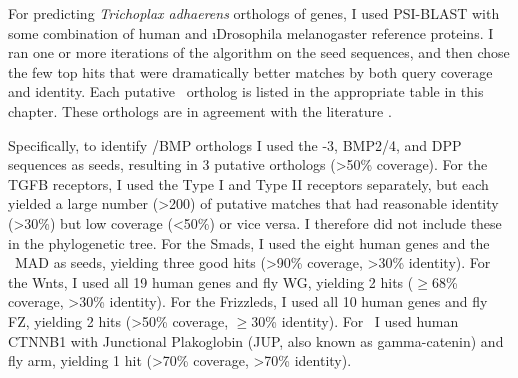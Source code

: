 For predicting \textit{Trichoplax adhaerens} orthologs of
genes, I used PSI-BLAST \cite{Altschul1997} with some combination of
human and \i{Drosophila melanogaster} reference proteins. I ran one or more
iterations of the algorithm on the seed sequences, and then chose the few top hits
that were dramatically better matches by both query coverage
and identity. Each putative \ta\ ortholog is listed in the appropriate table in
this chapter. These orthologs are in agreement with the literature
\cite{Srivastava2008}.


Specifically, to identify \tgf/BMP
orthologs I used the -3, BMP2/4, and DPP sequences as seeds,
resulting in 3 putative orthologs (>50\% coverage). For the TGFB receptors, I used
the Type I and Type II receptors separately, but each yielded
a large number (>200) of putative matches that had reasonable identity
(>30\%) but low coverage (<50\%) or vice versa. I therefore did not
include these in the phylogenetic tree. For the Smads,
I used the eight human genes and the \fly\ MAD as seeds, yielding three good hits
(>90\% coverage, >30\% identity). For the Wnts, I used all 19 human
genes and fly WG, yielding 2 hits ($\geq$68\% coverage, >30\% identity).
For the Frizzleds, I used all 10 human
genes and fly FZ, yielding 2 hits (>50\% coverage, $\geq$30\% identity).
For \bcat\ I used human CTNNB1 with Junctional Plakoglobin (JUP, also known
as gamma-catenin) and fly arm,
yielding 1 hit (>70\% coverage, >70\% identity).




